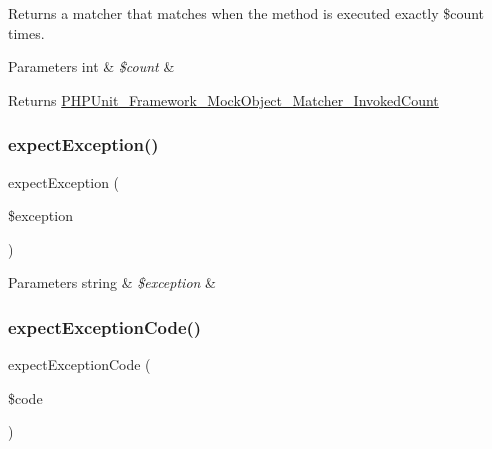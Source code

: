 Returns a matcher that matches when the method is executed exactly \$count times.


\begin{DoxyParams}[1]{Parameters}
int & {\em \$count} & \\
\hline
\end{DoxyParams}
\begin{DoxyReturn}{Returns}
\mbox{\hyperlink{class_p_h_p_unit___framework___mock_object___matcher___invoked_count}{P\+H\+P\+Unit\+\_\+\+Framework\+\_\+\+Mock\+Object\+\_\+\+Matcher\+\_\+\+Invoked\+Count}} 
\end{DoxyReturn}
\mbox{\label{class_p_h_p_unit___framework___test_case_ae0b518950cd43d617a7a356919ed389d}} 
\subsubsection{\texorpdfstring{expect\+Exception()}{expectException()}}
{\footnotesize\ttfamily expect\+Exception (\begin{DoxyParamCaption}\item[{}]{\$exception }\end{DoxyParamCaption})}


\begin{DoxyParams}[1]{Parameters}
string & {\em \$exception} & \\
\hline
\end{DoxyParams}
\mbox{\label{class_p_h_p_unit___framework___test_case_a772e8a7fb5f1876b8e689a562c8d1b6b}} 
\subsubsection{\texorpdfstring{expect\+Exception\+Code()}{expectExceptionCode()}}
{\footnotesize\ttfamily expect\+Exception\+Code (\begin{DoxyParamCaption}\item[{}]{\$code }\end{DoxyParamCaption})}


